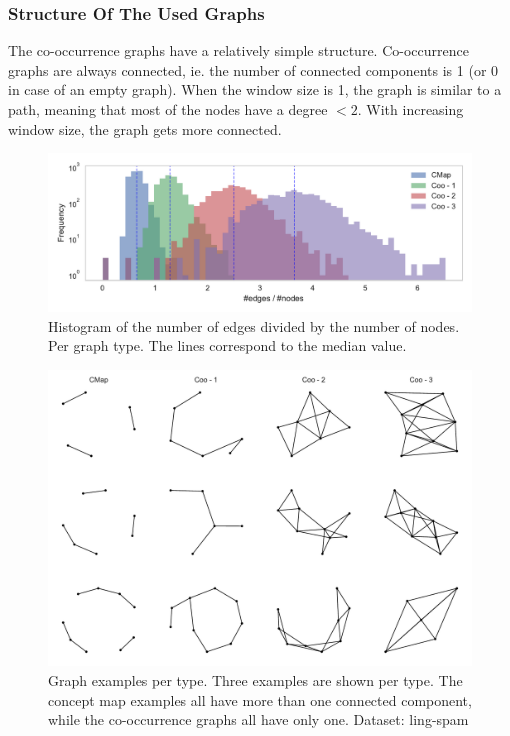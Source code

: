 
\subsubsection{Structure Of The Used Graphs}
The co-occurrence graphs have a relatively simple structure.
Co-occurrence graphs are always connected, ie. the number of connected components is 1 (or 0 in case of an empty graph).
When the window size is 1, the graph is similar to a path, meaning that most of the nodes have a degree $< 2$. With increasing window size, the graph gets more connected.

\begin{figure}[ht]
\centering
\includegraphics[width=0.7\linewidth]{assets/figures/hist-edgesnodes.pdf}
\caption{Histogram of the number of edges divided by the number of nodes. Per graph type. The lines correspond to the median value.}
\label{fig:histogram-edges-div-nodes-per-type}
\end{figure}

\begin{figure}[ht]
\centering
\includegraphics[width=0.6\linewidth]{assets/figures/graph-examples.pdf}
\caption{Graph examples per type. Three examples are shown per type. The concept map examples all have more than one connected component, while the co-occurrence graphs all have only one. Dataset: ling-spam}
\end{figure}

